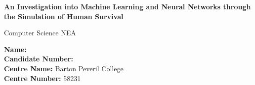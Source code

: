\documentclass{article}
\begin{document}
\begin{titlepage}
    \begin{center}
        \vspace{1cm}
        \Huge
        
        \textbf{An Investigation into Machine Learning and Neural Networks through the Simulation of Human Survival}
        
        \vspace{1cm}
        \Large
        Computer Science NEA
        
        \vfill
        
        \large
        \textbf{Name:} \\
        \textbf{Candidate Number:} \\
        
        \textbf{Centre Name:} Barton Peveril College\\
        \textbf{Centre Number:} 58231\\
        \pagebreak
    \end{center}
\end{titlepage}
\end{document}
